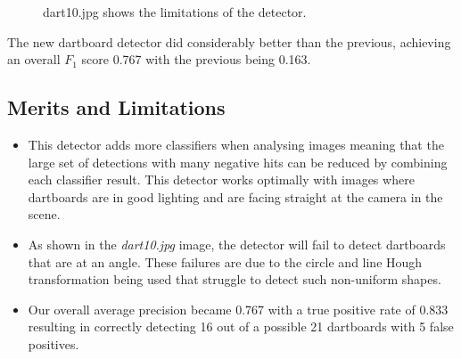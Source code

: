 \documentclass[a4paper]{article}
\begin{document}
\begin{figure}[H]
  \centering
  \hfill
   \hfill
   \hfill
   \caption{dart10.jpg shows the limitations of the detector.}
\end{figure}

The new dartboard detector did considerably better than the previous, achieving
an overall \(F_{1}\) score 0.767 with the previous being 0.163.

\subsection*{Merits and Limitations}
\vspace{-0.7em}
\begin{itemize}
    \item This detector adds more classifiers when analysing images meaning
      that the large set of detections with many negative hits can be reduced
      by combining each classifier result. This detector works optimally with
      images where dartboards are in good lighting and are facing straight at
    the camera in the scene.
  \item As shown in the \textit{dart10.jpg} image, the detector will fail to
    detect dartboards that are at an angle. These failures are due to the
    circle and line Hough transformation being used that struggle to detect
    such non-uniform shapes.
    \item Our overall average precision became 0.767 with a true positive rate
      of 0.833 resulting in correctly detecting 16 out of a possible 21
      dartboards with 5 false positives.
\end{itemize}
\end{document}
